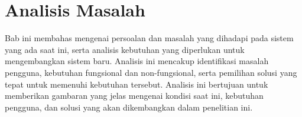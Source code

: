 \chapter{Analisis Masalah}
\label{chap:analisis-masalah}
Bab ini membahas mengenai persoalan dan masalah yang dihadapi pada sistem yang ada saat ini, serta analisis kebutuhan yang diperlukan untuk mengembangkan sistem baru. Analisis ini mencakup identifikasi masalah pengguna, kebutuhan fungsional dan non-fungsional, serta pemilihan solusi yang tepat untuk memenuhi kebutuhan tersebut. Analisis ini bertujuan untuk memberikan gambaran yang jelas mengenai kondisi saat ini, kebutuhan pengguna, dan solusi yang akan dikembangkan dalam penelitian ini.





